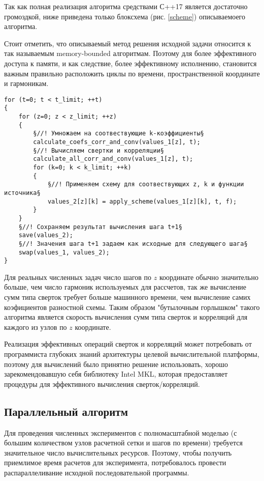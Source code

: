 Так как полная реализация алгоритма средствами С++17 является достаточно громоздкой, ниже приведена только блоксхема (рис. \ref{scheme}) описываемоего алгоритма.


Стоит отметить, что описываемый метод решения исходной задачи относится к так называемым memory-bounded алгоритмам.
Поэтому для более эффективного доступа к памяти, и как следствие, более эффективному исполнению,
становится важным правильно расположить циклы по времени, пространственной координате и гармоникам.

\begin{lstlisting}[style={CppCodeStyle}]
for (t=0; t < t_limit; ++t)
{
	for (z=0; z < z_limit; ++z)
	{
		§//! Умножаем на соотвествующие k-коэффициенты§
		calculate_coefs_corr_and_conv(values_1[z], t);
		§//! Вычисляем свертки и корреляции§
		calculate_all_corr_and_conv(values_1[z], t);
		for (k=0; k < k_limit; ++k)
		{
			§//! Применяем схему для соотвествующих z, k и функции источника§
			values_2[z][k] = apply_scheme(values_1[z][k], t, f);
		}
	}
	§//! Сохраняем результат вычисления шага t+1§
	save(values_2);
	§//! Значения шага t+1 задаем как исходные для следующего шага§
	swap(values_1, values_2);
}
\end{lstlisting}

Для реальных численных задач число шагов по $z$ координате обычно значительно больше, чем число гармоник используемых для рассчетов,
так же вычисление сумм типа сверток требует больше машинного времени, чем вычисление самих коэфициентов разностной схемы.
Таким образом "бутылочным горлышком" такого алгоритма является скорость вычисления сумм типа сверток и корреляций для
каждого из узлов по $z$ координате.

Реализация эффективных операций сверток и корреляций может потребовать от программиста глубоких знаний архитектуры 
целевой вычислительной платформы, поэтому для вычислений было принятно решение использовать,
хорошо зарекомендовавшую себя библиотеку Intel MKL, которая предоставляет процедуры для эффективного вычисления сверток/корреляций.

\subsection{Параллельный алгоритм}
Для проведения численных экспериментов с полномасштабной моделью (с большим количеством узлов расчетной сетки и шагов по времени)
требуется значительное число вычислительных ресурсов. Поэтому, чтобы получить приемлимое время расчетов для эксперимента,
потребовалось провести распараллеливание исходной последовательной программы.

